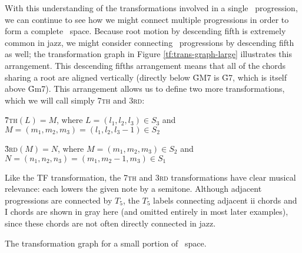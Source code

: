 \documentclass[diss]{subfiles}
\begin{document}
With this understanding of the transformations involved in a single
\tfo\ progression, we can continue to see how we might connect multiple
progressions in order to form a complete \tf\ space. Because root motion by
descending fifth is extremely common in jazz, we might consider connecting
\tfo\ progressions by descending fifth as well; the transformation graph in
Figure \ref{tf:trans-graph-large} illustrates this arrangement. This
descending fifths arrangement means that all of the chords sharing a root are
aligned vertically (directly below \h{GM7} is \h{G7}, which is itself above
\h{Gm7}). This arrangement allows us to define two more transformations, which
we will call simply \textsc{7th} and \textsc{3rd}:

\vspace{0.5\baselineskip}
\h{7}\textsc{th}$(L) = M$, where $L = (l_1, l_2, l_3) \in S_3$ and $M=(m_1, m_2,
m_3)=(l_1, l_2, l_3-1) \in S_2$

\h{3}\textsc{rd}$(M) = N$, where $M = (m_1, m_2, m_3) \in S_2$ and $N=(n_1, n_2,
n_3)=(m_1, m_2-1, m_3) \in S_1$
\vspace{0.5\baselineskip}

Like the TF transformation, the \textsc{7th} and \textsc{3rd} transformations
have clear musical relevance: each lowers the given note by a
semitone. Although adjacent progressions are connected by $T_5$, the $T_5$
labels connecting adjacent ii chords and I chords are shown in
gray here (and omitted entirely in most later examples), since these chords
are not often directly connected in jazz.

\figBeg[thbp]
  \caption{The transformation graph for a small portion of \tf\ space.}
  \label{tf:trans-graph-large}
\figEnd
\end{document}
